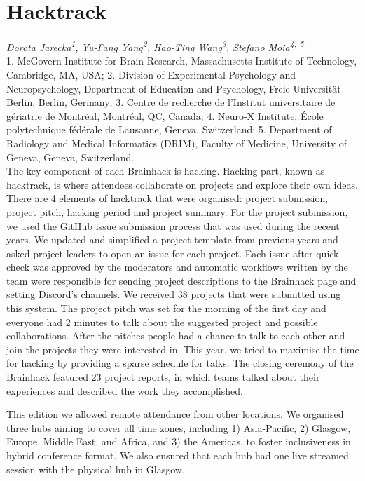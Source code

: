 \documentclass[10pt,a4paper,twocolumns]{proc}
\newcommand{\authors}[1]{\emph{\footnotesize #1} \\}
\newcommand{\affiliations}[1]{{\scriptsize #1} \\}
\begin{document}
\section{Hacktrack}

\authors{Dorota Jarecka\textsuperscript{1}, %
Yu-Fang Yang\textsuperscript{2}, %
Hao-Ting Wang\textsuperscript{3}, %
Stefano Moia\textsuperscript{4, 5}}
%
\affiliations{1. McGovern Institute for Brain Research, Massachusetts Institute of Technology, Cambridge, MA, USA; %
2. Division of Experimental Psychology and Neuropsychology, Department of Education and Psychology, Freie Universität Berlin, Berlin, Germany; %
3. Centre de recherche de l'Institut universitaire de gériatrie de Montréal, Montréal, QC, Canada; %
4. Neuro-X Institute, École polytechnique fédérale de Lausanne, Geneva, Switzerland; %
5. Department of Radiology and Medical Informatics (DRIM), Faculty of Medicine, University of Geneva, Geneva, Switzerland.}

The key component of each Brainhack is hacking. Hacking part, known as
hacktrack, is where attendees collaborate on projects and explore their
own ideas. There are 4 elements of hacktrack that were organised:
project submission, project pitch, hacking period and project summary.
For the project submission, we used the GitHub issue submission process
that was used during the recent years. We updated and simplified a
project template from previous years and asked project leaders to open
an issue for each project. Each issue after quick check was approved by
the moderators and automatic workflows written by the team were
responsible for sending project descriptions to the Brainhack page and
setting Discord's channels. We received 38 projects that were submitted
using this system. The project pitch was set for the morning of the
first day and everyone had 2 minutes to talk about the suggested project
and possible collaborations. After the pitches people had a chance to
talk to each other and join the projects they were interested in. This
year, we tried to maximise the time for hacking by providing a sparse
schedule for talks. The closing ceremony of the Brainhack featured 23
project reports, in which teams talked about their experiences and
described the work they accomplished.

This edition we allowed remote attendance from other locations. We
organised three hubs aiming to cover all time zones, including 1)
Asia-Pacific, 2) Glasgow, Europe, Middle East, and Africa, and 3) the
Americas, to foster inclusiveness in hybrid conference format. We also
ensured that each hub had one live streamed session with the physical
hub in Glasgow.
\end{document}
